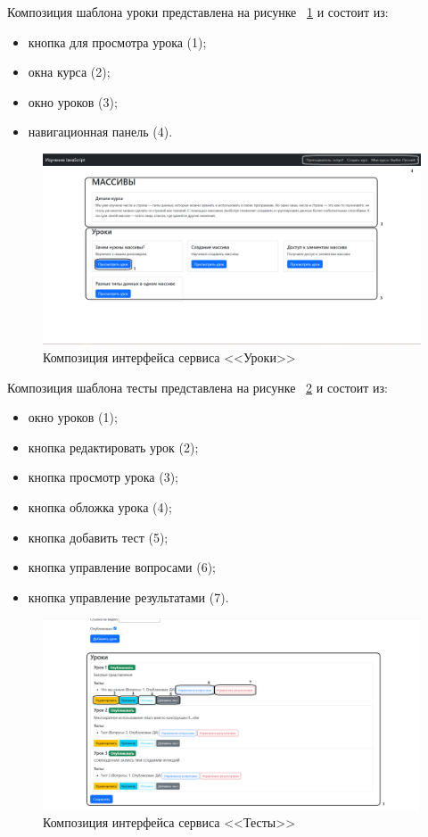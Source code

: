 Композиция шаблона уроки представлена на рисунке ~\ref{templ:image3} и состоит из:

\begin{itemize}
	\item кнопка для просмотра урока (1);
	\item окна курса (2);
	\item окно уроков (3);
	\item навигационная панель (4).
\end{itemize}

\begin{figure}[h]
	\centering
	\includegraphics[width=1\linewidth]{images/уроки}
	\caption{Композиция интерфейса сервиса <<Уроки>>}
	\label{templ:image3}
\end{figure}

Композиция шаблона тесты представлена на рисунке ~\ref{templ:image4} и состоит из:

\begin{itemize}
	\item окно уроков (1);
	\item кнопка редактировать урок (2);
	\item кнопка просмотр урока (3);
	\item кнопка обложка урока (4);
	\item кнопка добавить тест (5);
	\item кнопка управление вопросами (6);
	\item кнопка управление результатами (7).
\end{itemize}

\begin{figure}[h]
	\centering
	\includegraphics[width=1\linewidth]{images/Тесты}
	\caption{Композиция интерфейса сервиса <<Тесты>>}
	\label{templ:image4}
\end{figure}

